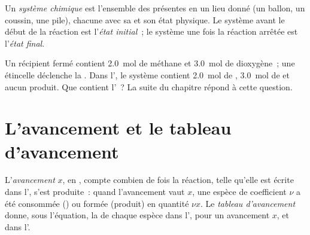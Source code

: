 \begin{definition}\label{def:g10:reaction-progress-table:system}
Un \emph{système chimique} est l'ensemble des
 présentes en un lieu donné (un ballon, un coussin, une
pile), chacune avec sa  et son état physique. Le
système avant le début de la réaction est l'\emph{état
initial}~; le système une fois la réaction arrêtée
est l'\emph{état final}.
\end{definition}


\begin{example}\label{ex:g10:reaction-progress-table:methane}
Un récipient fermé contient \qty{2.0}{mol} de méthane et \qty{3.0}{mol}
de dioxygène~; une étincelle déclenche la 
. Dans l', le système contient
\qty{2.0}{mol} de , \qty{3.0}{mol} de  et aucun
produit. Que contient l'~? La suite du chapitre répond à cette
question.
\end{example}

\section{L'avancement et le tableau d'avancement}

\begin{definition}\label{def:g10:reaction-progress-table:extent}
L'\emph{avancement} $x$, en , compte combien de
fois la réaction, telle qu'elle est écrite dans l', s'est
produite~: quand l'avancement vaut $x$, une espèce de coefficient $\nu$
a été consommée () ou formée (produit) en quantité $\nu x$. Le
\emph{tableau d'avancement} donne, sous
l'équation, la  de chaque espèce dans l',
pour un avancement $x$, et dans l'.
\end{definition}

